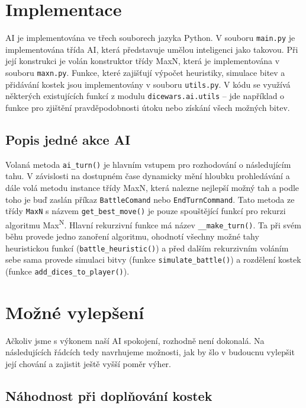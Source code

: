 \documentclass[a4paper]{article}
\begin{document}
\section{Implementace}

AI je implementována ve třech souborech jazyka Python. V souboru \texttt{main.py} je implementována třída AI, která představuje umělou inteligenci jako takovou. Při její konstrukci je volán konstruktor třídy MaxN, která je implementována v souboru \texttt{maxn.py}. Funkce, které zajišťují výpočet heuristiky, simulace bitev a přidávání kostek jsou implementovány v souboru \texttt{utils.py}. V kódu se využívá některých existujících funkcí z modulu \texttt{dicewars.ai.utils} -- jde například o funkce pro zjištění pravděpodobnosti útoku nebo získání všech možných bitev.

\subsection{Popis jedné akce AI}

Volaná metoda \texttt{ai\_turn()} je hlavním vstupem pro rozhodování o následujícím tahu. V závislosti na dostupném čase dynamicky mění hloubku prohledávání a dále volá metodu instance třídy MaxN, která nalezne nejlepší možný tah a podle toho je buď zaslán příkaz \texttt{BattleComand} nebo \texttt{EndTurnCommand}. Tato metoda ze třídy \texttt{MaxN} s názvem \texttt{get\_best\_move()} je pouze spouštějící funkcí pro rekurzi algoritmu Max\textsuperscript{N}. Hlavní rekurzivní funkce má název \texttt{\_\_make\_turn()}. Ta při svém běhu provede jedno zanoření algoritmu, ohodnotí všechny možné tahy heuristickou funkcí (\texttt{battle\_heuristic()}) a před dalším rekurzivním voláním sebe sama provede simulaci bitvy (funkce \texttt{simulate\_battle()}) a rozdělení kostek (funkce \texttt{add\_dices\_to\_player()}).
 
\section{Možné vylepšení}

Ačkoliv jsme s výkonem naší AI spokojení, rozhodně není dokonalá. Na následujících řádcích tedy navrhujeme možnosti, jak by šlo v budoucnu vylepšit její chování a zajistit ještě vyšší poměr výher.

\subsection{Náhodnost při doplňování kostek}
\end{document}

